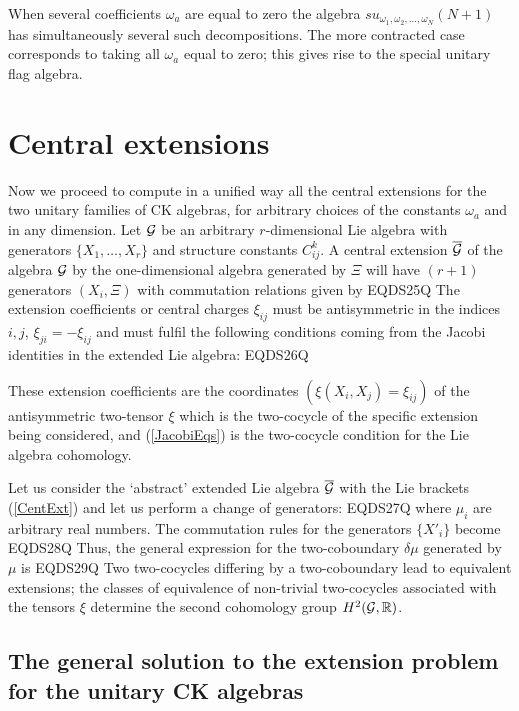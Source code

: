 \documentclass[12pt]{article}
\begin{document}
When several coefficients ${\omega}_a$ are equal to zero the algebra
$su_{{\omega}_1,{\omega}_2,\dots,{\omega}_N}(N+1)$ has simultaneously several such
decompositions. The more contracted case corresponds
to taking all ${\omega}_a$ equal to zero; this gives rise to the  special
unitary flag algebra.

\section{Central extensions}
\label{sec.3}

Now we proceed to compute in a unified way all the central extensions
for the two unitary families of CK algebras, for arbitrary choices of
the constants ${\omega}_a$ and  in any dimension. Let ${{\cal G}}$  be an arbitrary
$r$-dimensional Lie algebra with generators $\{X_1,\dots,X_r\}$ and
structure constants
$C_{ij}^k$. A central extension   $\overline{{\cal G}}$ of the algebra ${{\cal G}}$
by the one-dimensional algebra generated by
 $\Xi$ will have $(r+1)$ generators
$( X_i,\Xi) $ with commutation relations given by
EQDS25Q
The   extension coefficients or  central charges
${\xi}_{ij}$  must be antisymmetric in the indices $i,j$,
${\xi}_{ji}=-{\xi}_{ij}$ and must fulfil the following conditions
coming from the Jacobi identities in the extended Lie algebra:
EQDS26Q

These  extension coefficients  are the coordinates
$({\xi}(X_i,X_j)={\xi}_{ij})$ of the antisymmetric
two-tensor ${\xi}$ which is the two-cocycle of the specific extension
being considered, and  (\ref{JacobiEqs}) is
the two-cocycle condition for the Lie algebra cohomology.

Let us consider  the `abstract' extended Lie algebra $\overline{{\cal G}}$
with the  Lie brackets (\ref{CentExt}) and let us perform a change of
generators:
EQDS27Q
where $\mu_i$ are arbitrary real
numbers. The commutation rules
for the generators $\{X'_i\}$ become
EQDS28Q
Thus, the general expression for the two-coboundary $\delta\mu$
generated  by $\mu$ is
EQDS29Q
Two two-cocycles differing by a two-coboundary lead to equivalent
extensions; the classes of equivalence of non-trivial two-cocycles
associated with the tensors ${\xi}$ determine the second cohomology group
$H^2({{\cal G}},{{\mathbb R}})$.

\subsection{The  general solution to the extension problem for the
 unitary CK algebras}
\end{document}
